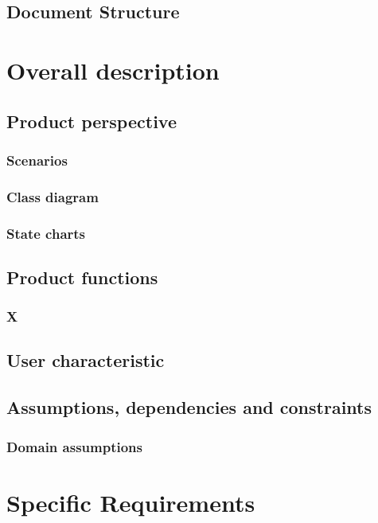 \documentclass{article}
\begin{document}
\subsection{Document Structure}

\section{Overall description}

\subsection{Product perspective}

\subsubsection{Scenarios}

\subsubsection{Class diagram}

\subsubsection{State charts}

\subsection{Product functions}

\subsubsection{X}

\subsection{User characteristic}

\subsection{Assumptions, dependencies and constraints}

\subsubsection{Domain assumptions}

\section{Specific Requirements }
\end{document}
